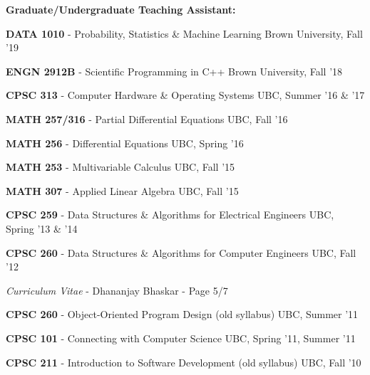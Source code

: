 \documentclass[margin,line]{res}
\newenvironment{list1}{
  \begin{list}{\ding{113}}{
      \setlength{\itemsep}{0in}
      \setlength{\parsep}{0in} \setlength{\parskip}{0in}
      \setlength{\topsep}{0in} \setlength{\partopsep}{0in}
      \setlength{\leftmargin}{0.17in}}}{\end{list}}
\begin{document}
\begin{resume}

\textbf{Graduate/Undergraduate Teaching Assistant:}
\vspace*{.2cm}

\begin{list1}
\setlength\itemsep{0.25em}
\item[] {\bf DATA 1010} - Probability, Statistics \& Machine Learning \hfill Brown University, Fall '19
\item[] {\bf ENGN 2912B} - Scientific Programming in C++ \hfill Brown University, Fall '18
\item[] {\bf CPSC 313} - Computer Hardware \& Operating Systems \hfill UBC, Summer '16 \& '17
\item[] {\bf MATH 257/316} - Partial Differential Equations \hfill UBC, Fall '16
\item[] {\bf MATH 256} - Differential Equations \hfill UBC, Spring '16
\item[] {\bf MATH 253} - Multivariable Calculus \hfill UBC, Fall '15
\item[] {\bf MATH 307} - Applied Linear Algebra \hfill UBC, Fall '15
\item[] {\bf CPSC 259} - Data Structures \& Algorithms for Electrical Engineers \hfill UBC, Spring '13 \& '14
\item[] {\bf CPSC 260} - Data Structures \& Algorithms for Computer Engineers \hfill UBC, Fall '12
\end{list1}

\newpage
\begin{flushright}
\textit{Curriculum Vitae} - Dhananjay Bhaskar - Page 5/7
\end{flushright}
\vspace*{.1cm}

\begin{list1}
\setlength\itemsep{0.25em}
\item[] {\bf CPSC 260} - Object-Oriented Program Design (old syllabus) \hfill UBC, Summer '11
\item[] {\bf CPSC 101} - Connecting with Computer Science \hfill UBC, Spring '11, Summer '11
\item[] {\bf CPSC 211} - Introduction to Software Development (old syllabus) \hfill UBC, Fall '10
\end{list1}


\end{resume}
\end{document}
